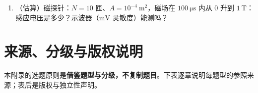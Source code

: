 \begin{enumerate}
\item （估算）磁探针：$N=10$ 匝、$A=10^{-4}\ \mathrm{m^2}$，磁场在 $100\ \mathrm{\mu s}$ 内从 0 升到 $1\ \mathrm{T}$：感应电压是多少？示波器（$\mathrm{mV}$ 灵敏度）能测吗？
\end{enumerate}


\section{来源、分级与版权说明}
\label{sec:app-l-source}

\begingroup\small
本附录的选题原则是\textbf{借鉴题型与分级，不复制题目}。下表逐章说明每题型的参照来源；表后是版权与独立性声明。

